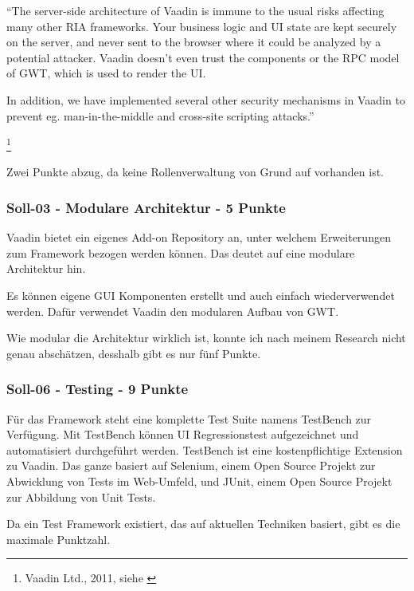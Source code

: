   \begin{itshape}``The server-side architecture of Vaadin is immune to the usual
  risks affecting many other RIA frameworks. Your business logic and UI state
  are kept securely on the server, and never sent to the browser where it could
  be analyzed by a potential attacker. Vaadin doesn't even trust the components
  or the RPC model of GWT, which is used to render the UI.

  In addition, we have implemented several other security mechanisms in Vaadin
  to prevent eg. man-in-the-middle and cross-site scripting
  attacks.''\end{itshape}
  \footnote{Vaadin Ltd., 2011, siehe \cite{VaadinSecurityAlerts}}
  \newline
  
  \noindent
  Zwei Punkte abzug, da keine Rollenverwaltung von Grund auf vorhanden ist.
  
  \subsubsection{Soll-03 - Modulare Architektur - 5 Punkte}
  
  Vaadin bietet ein eigenes Add-on Repository an, unter welchem Erweiterungen
  zum Framework bezogen werden können. Das deutet auf eine modulare Architektur
  hin.
  
  Es können eigene \ac{GUI} Komponenten erstellt und auch einfach
  wiederverwendet werden. Dafür verwendet Vaadin den modularen Aufbau von
  \ac{GWT}.
  
  Wie modular die Architektur wirklich ist, konnte ich nach meinem Research
  nicht genau abschätzen, desshalb gibt es nur fünf Punkte.
  
  \subsubsection{Soll-06 - Testing - 9 Punkte}
  
  Für das Framework steht eine komplette Test Suite namens TestBench zur
  Verfügung. Mit TestBench können UI Regressionstest aufgezeichnet und
  automatisiert durchgeführt werden. TestBench ist eine kostenpflichtige
  Extension zu Vaadin. Das ganze basiert auf Selenium, einem Open Source
  Projekt zur Abwicklung von Tests im Web-Umfeld, und JUnit, einem Open Source
  Projekt zur Abbildung von Unit Tests.
  
  Da ein Test Framework existiert, das auf aktuellen Techniken basiert, gibt es
  die maximale Punktzahl.
  
